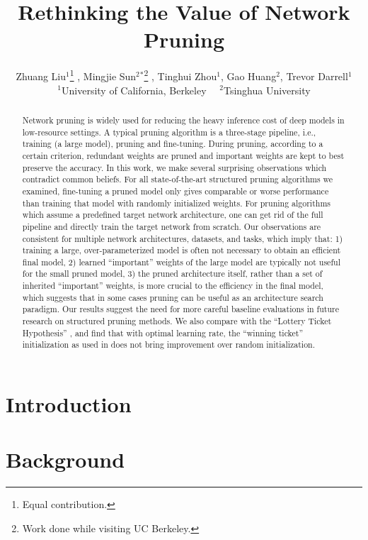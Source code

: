 \documentclass{article} %
\title{Rethinking the Value of Network Pruning}
\author{
Zhuang Liu$^1$\thanks{Equal contribution.} ,  Mingjie Sun$^{2}{}^{*}$\thanks{Work done while visiting UC Berkeley.} , Tinghui Zhou$^1$, Gao Huang$^2$, Trevor Darrell$^1$ \vspace{0.30ex} \\
$^1$University of California, Berkeley ~~$^2$Tsinghua University\\}
\begin{document}
\maketitle


\begin{abstract}
Network pruning is widely used for reducing the heavy inference cost of deep models in low-resource settings. A typical pruning algorithm is a three-stage pipeline, i.e., training (a large model), pruning and fine-tuning. During pruning, according to a certain criterion, redundant weights are pruned and important weights are kept to best preserve the accuracy. In this work, we make several surprising observations which contradict common beliefs. For all state-of-the-art structured pruning algorithms we examined, fine-tuning a pruned model only gives comparable or worse performance than training that model with randomly initialized weights. 
For pruning algorithms which assume a predefined target network architecture, one can get rid of the full pipeline and directly train the target network from scratch.
Our observations are consistent for multiple network architectures, datasets, and tasks, which imply that: 1) training a large, over-parameterized model is often not necessary to obtain an efficient final model, 2) learned ``important'' weights of the large model are typically not useful for the small pruned model, 3) the pruned architecture itself, rather than a set of inherited ``important'' weights, is more crucial to the efficiency in the final model, which suggests that in some cases pruning can be useful as an architecture search paradigm.
Our results suggest the need for more careful baseline evaluations in future research on structured pruning methods. 
We also compare with the ``Lottery Ticket Hypothesis'' \citep{lottery}, and find that with optimal learning rate, the ``winning ticket'' initialization as used in \citet{lottery} does not bring improvement over random initialization.
\end{abstract}

\vspace{-1ex}
\section{Introduction}


\vspace{-1ex}
\section{Background}

\end{document}
